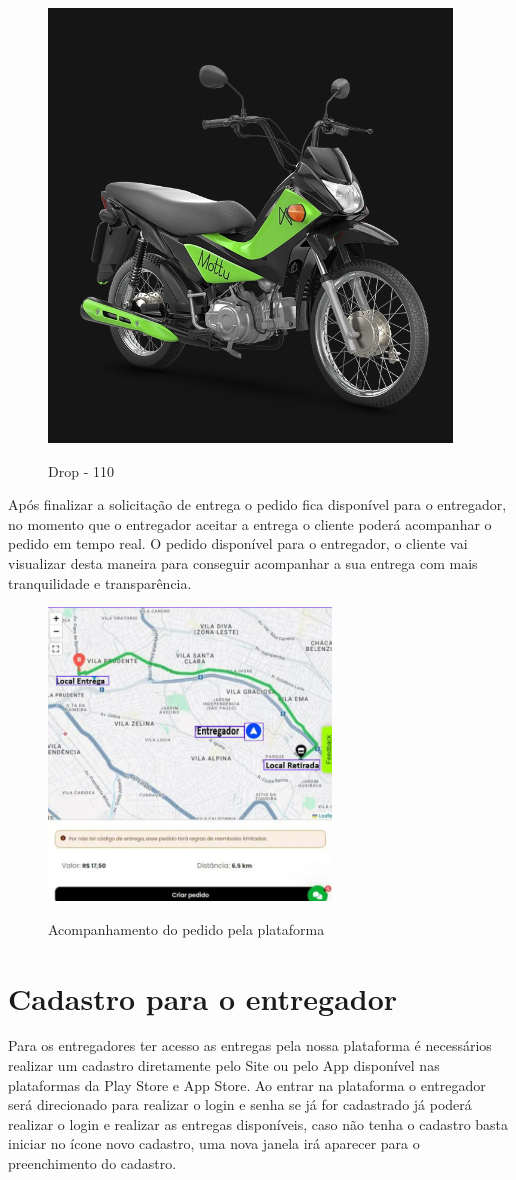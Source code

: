\begin{figure}[!ht]
    {
    \centering
    \caption{Drop - 110}
    \includegraphics[width=0.5\linewidth]{figuras/Drop110.png}
    \label{fig:enter-label}
    }
\end{figure}
    


Após finalizar a solicitação de entrega o pedido fica disponível para o entregador, no momento que o entregador aceitar a entrega o cliente poderá acompanhar o pedido em tempo real. O pedido disponível para o entregador, o cliente vai visualizar desta maneira para conseguir acompanhar a sua entrega com mais tranquilidade e transparência.

\begin{figure} [!ht]
   {\centering
    \caption{Acompanhamento do pedido pela plataforma}
    \includegraphics[width=0.4\linewidth]{figuras/pedido.png}
    \label{fig:enter-label}
    }
\end{figure}

\section{Cadastro para o entregador}

Para os entregadores ter acesso as entregas pela nossa plataforma é necessários realizar um cadastro diretamente pelo Site ou pelo App disponível nas plataformas da Play Store e App Store. Ao entrar na plataforma o entregador será direcionado para realizar o login e senha se já for cadastrado já poderá realizar o login e realizar as entregas disponíveis, caso não tenha o cadastro basta iniciar no ícone novo cadastro, uma nova janela irá aparecer para o preenchimento do cadastro.

